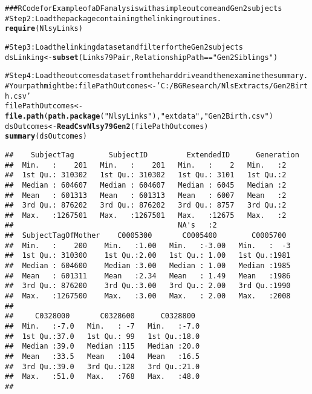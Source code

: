 \documentclass[letterpaper]{article}\usepackage{graphicx, color}
\makeatletter
\newcommand{\hlfunctioncall}[1]{\textcolor[rgb]{0.501960784313725,0,0.329411764705882}{\textbf{#1}}}%
\newcommand{\hlstring}[1]{\textcolor[rgb]{0.6,0.6,1}{#1}}%
\newcommand{\hlcomment}[1]{\textcolor[rgb]{0.180392156862745,0.6,0.341176470588235}{#1}}%
\newenvironment{kframe}{%
 \def\at@end@of@kframe{}%
 \ifinner\ifhmode%
  \def\at@end@of@kframe{\end{minipage}}%
  \begin{minipage}{\columnwidth}%
 \fi\fi%
 \def\FrameCommand##1{\hskip\@totalleftmargin \hskip-\fboxsep
 \colorbox{shadecolor}{##1}\hskip-\fboxsep
     \hskip-\linewidth \hskip-\@totalleftmargin \hskip\columnwidth}%
 \MakeFramed {\advance\hsize-\width
   \@totalleftmargin\z@ \linewidth\hsize
   \@setminipage}}%
 {\par\unskip\endMakeFramed%
 \at@end@of@kframe}
\newenvironment{knitrout}{}{} %
\makeatother
\begin{document}
\begin{knitrout}
\color{fgcolor}\begin{kframe}
\begin{alltt}
\hlcomment{### R Code for Example of a DF analysis with a simple outcome and Gen2 subjects}
\hlcomment{#Step 2: Load the package containing the linking routines.}
\hlfunctioncall{require}(NlsyLinks) 

\hlcomment{#Step 3: Load the linking dataset and filter for the Gen2 subjects}
dsLinking <- \hlfunctioncall{subset}(Links79Pair, RelationshipPath==\hlstring{"Gen2Siblings"})

\hlcomment{#Step 4: Load the outcomes dataset from the hard drive and then examine the summary.}
\hlcomment{#   Your path might be: filePathOutcomes <- 'C:/BGResearch/NlsExtracts/Gen2Birth.csv'}
filePathOutcomes <- \hlfunctioncall{file.path}(\hlfunctioncall{path.package}(\hlstring{"NlsyLinks"}), \hlstring{"extdata"}, \hlstring{"Gen2Birth.csv"})
dsOutcomes <- \hlfunctioncall{ReadCsvNlsy79Gen2}(filePathOutcomes)
\hlfunctioncall{summary}(dsOutcomes)
\end{alltt}
\begin{verbatim}
##    SubjectTag        SubjectID         ExtendedID      Generation
##  Min.   :    201   Min.   :    201   Min.   :    2   Min.   :2   
##  1st Qu.: 310302   1st Qu.: 310302   1st Qu.: 3101   1st Qu.:2   
##  Median : 604607   Median : 604607   Median : 6045   Median :2   
##  Mean   : 601313   Mean   : 601313   Mean   : 6007   Mean   :2   
##  3rd Qu.: 876202   3rd Qu.: 876202   3rd Qu.: 8757   3rd Qu.:2   
##  Max.   :1267501   Max.   :1267501   Max.   :12675   Max.   :2   
##                                      NA's   :2                   
##  SubjectTagOfMother    C0005300       C0005400        C0005700   
##  Min.   :    200    Min.   :1.00   Min.   :-3.00   Min.   :  -3  
##  1st Qu.: 310300    1st Qu.:2.00   1st Qu.: 1.00   1st Qu.:1981  
##  Median : 604600    Median :3.00   Median : 1.00   Median :1985  
##  Mean   : 601311    Mean   :2.34   Mean   : 1.49   Mean   :1986  
##  3rd Qu.: 876200    3rd Qu.:3.00   3rd Qu.: 2.00   3rd Qu.:1990  
##  Max.   :1267500    Max.   :3.00   Max.   : 2.00   Max.   :2008  
##                                                                  
##     C0328000       C0328600      C0328800   
##  Min.   :-7.0   Min.   : -7   Min.   :-7.0  
##  1st Qu.:37.0   1st Qu.: 99   1st Qu.:18.0  
##  Median :39.0   Median :115   Median :20.0  
##  Mean   :33.5   Mean   :104   Mean   :16.5  
##  3rd Qu.:39.0   3rd Qu.:128   3rd Qu.:21.0  
##  Max.   :51.0   Max.   :768   Max.   :48.0  
## 
\end{verbatim}
\begin{alltt}


\end{alltt}
\end{kframe}
\end{knitrout}
\end{document}
